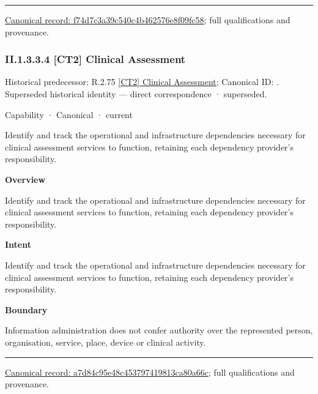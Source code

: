 \medskip\hrule\medskip

{\footnotesize \href{../../../../../../../continuum/strategy/capability/f74d7c3a39c540c4b462576e8f09fc58.md}{Canonical record: f74d7c3a39c540c4b462576e8f09fc58}; full qualifications and provenance.}\par
\subsubsection*{II.1.3.3.4 [CT2] Clinical Assessment}
\label{navigation:II.1.3.3.4}

{\small Historical predecessor: R.2.75 \hyperref[element:1c3b553c87704e27ba211fbbd02d95cb]{[CT2] Clinical Assessment}; Canonical ID: \texttt{}. Superseded historical identity — direct correspondence · superseded.}\par
\label{element:a7d84c95e48c453797419813ca80a66c}
{\small Capability · Canonical · current}\par

Identify and track the operational and infrastructure dependencies necessary for clinical assessment services to function, retaining each dependency provider's responsibility.



\textbf{Overview}



Identify and track the operational and infrastructure dependencies necessary for clinical assessment services to function, retaining each dependency provider's responsibility.



\textbf{Intent}



Identify and track the operational and infrastructure dependencies necessary for clinical assessment services to function, retaining each dependency provider's responsibility.



\textbf{Boundary}



Information administration does not confer authority over the represented person, organisation, service, place, device or clinical activity.



\medskip\hrule\medskip

{\footnotesize \href{../../../../../../../continuum/strategy/capability/a7d84c95e48c453797419813ca80a66c.md}{Canonical record: a7d84c95e48c453797419813ca80a66c}; full qualifications and provenance.}\par
